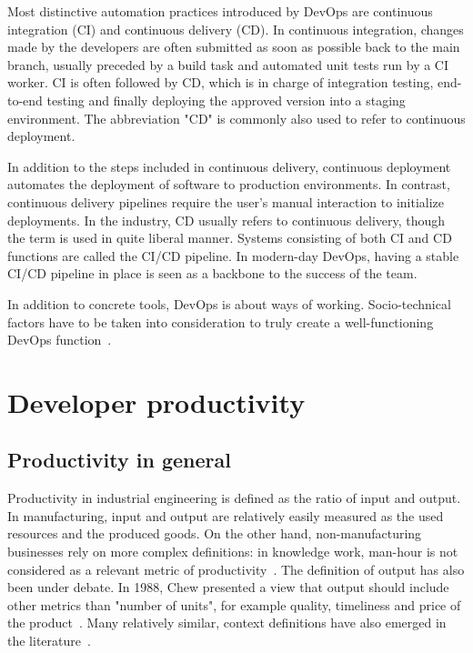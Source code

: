Most distinctive automation practices introduced by DevOps are continuous integration (CI) and continuous delivery (CD). In continuous integration, changes made by the developers are often submitted as soon as possible back to the main branch, usually preceded by a build task and automated unit tests run by a CI worker. CI is often followed by CD, which is in charge of integration testing, end-to-end testing and finally deploying the approved version into a staging environment. The abbreviation "CD" is commonly also used to refer to continuous deployment. 

In addition to the steps included in continuous delivery, continuous deployment automates the deployment of software to production environments. In contrast, continuous delivery pipelines require the user's manual interaction to initialize deployments. In the industry, CD usually refers to continuous delivery, though the term is used in quite liberal manner. Systems consisting of both CI and CD functions are called the CI/CD pipeline. In modern-day DevOps, having a stable CI/CD pipeline in place is seen as a backbone to the success of the team. 

In addition to concrete tools, DevOps is about ways of working. Socio-technical factors have to be taken into consideration to truly create a well-functioning DevOps function~\cite{hemon-hildgen_agile_2020}. 




\section{Developer productivity}

\subsection{Productivity in general}
Productivity in industrial engineering is defined as the ratio of input and output\cite{syverson_what_2011, chew_no-nonsense_1988}. In manufacturing, input and output are relatively easily measured as the used resources and the produced goods. On the other hand, non-manufacturing businesses rely on more complex definitions: in knowledge work, man-hour is not considered as a relevant metric of productivity~\cite{tangen_demystifying_2005}. The definition of output has also been under debate. In 1988, Chew presented a view that output should include other metrics than "number of units", for example quality, timeliness and price of the product~\cite{chew_no-nonsense_1988}. Many relatively similar, context definitions have also emerged in the literature~\cite{tangen_demystifying_2005}.

